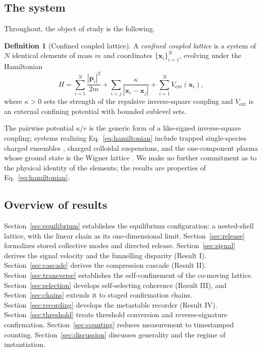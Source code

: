 \documentclass[twocolumn,10pt,a4paper]{article}
\theoremstyle{thmstyle}
\theoremstyle{definition}
\newtheorem{definition}[theorem]{Definition}
\theoremstyle{remark}
\begin{document}
\subsection{The system}

Throughout, the object of study is the following.

\begin{definition}[Confined coupled lattice]
\label{def:lattice}
A \emph{confined coupled lattice} is a system of $N$ identical elements of
mass $m$ and coordinates $\{\mathbf{x}_i\}_{i=1}^N$, evolving under the
Hamiltonian
\begin{equation}
H = \sum_{i=1}^N \frac{|\mathbf{p}_i|^2}{2m}
  + \sum_{i<j} \frac{\kappa}{|\mathbf{x}_i-\mathbf{x}_j|}
  + \sum_{i=1}^N V_{\mathrm{ext}}(\mathbf{x}_i),
\label{eq:hamiltonian}
\end{equation}
where $\kappa>0$ sets the strength of the repulsive inverse-square coupling
and $V_{\mathrm{ext}}$ is an external confining potential with bounded
sublevel sets.
\end{definition}

The pairwise potential $\kappa/r$ is the generic form of a like-signed
inverse-square coupling; systems realizing Eq.~\eqref{eq:hamiltonian} include
trapped single-species charged ensembles \citep{dubin1999,birkl1992},
charged colloidal suspensions, and the one-component plasma whose ground
state is the Wigner lattice \citep{wigner1934}. We make no further
commitment as to the physical identity of the elements; the results are
properties of Eq.~\eqref{eq:hamiltonian}.

\subsection{Overview of results}

Section~\ref{sec:equilibrium} establishes the equilibrium configuration: a
nested-shell lattice, with the linear chain as its one-dimensional limit.
Section~\ref{sec:release} formalizes stored collective modes and directed
release. Section~\ref{sec:signal} derives the signal velocity and the
funnelling disparity (Result I). Section~\ref{sec:cascade} derives the
compression cascade (Result II). Section~\ref{sec:transverse} establishes the
self-confinement of the co-moving lattice. Section~\ref{sec:selection}
develops self-selecting coherence (Result III), and Section~\ref{sec:chains}
extends it to staged confirmation chains. Section~\ref{sec:recording}
develops the metastable recorder (Result IV). Section~\ref{sec:threshold}
treats threshold conversion and reverse-signature confirmation.
Section~\ref{sec:counting} reduces measurement to timestamped counting.
Section~\ref{sec:discussion} discusses generality and the regime of
instantiation.
\end{document}
